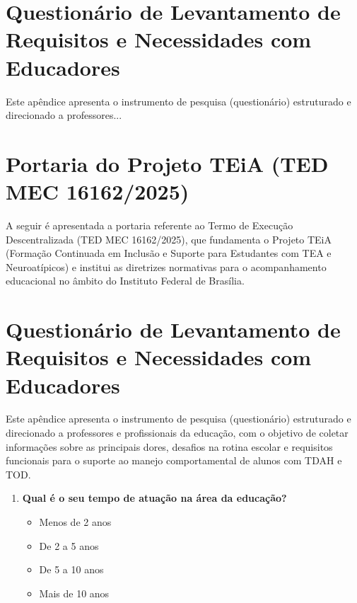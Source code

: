 \begin{apendicesenv}
\partapendices %

\chapter{Questionário de Levantamento de Requisitos e Necessidades com Educadores}
\label{apendice:questionario}
Este apêndice apresenta o instrumento de pesquisa (questionário) estruturado e direcionado a professores... 

\chapter{Portaria do Projeto TEiA (TED MEC 16162/2025)}
\label{apendice:portaria_teia}

A seguir é apresentada a portaria referente ao Termo de Execução Descentralizada (TED MEC 16162/2025), que fundamenta o Projeto TEiA (Formação Continuada em Inclusão e Suporte para Estudantes com TEA e Neuroatípicos) e institui as diretrizes normativas para o acompanhamento educacional no âmbito do Instituto Federal de Brasília.



\chapter{Questionário de Levantamento de Requisitos e Necessidades com Educadores}
\label{ap:questionario_educadores}

Este apêndice apresenta o instrumento de pesquisa (questionário) estruturado e direcionado a professores e profissionais da educação, com o objetivo de coletar informações sobre as principais dores, desafios na rotina escolar e requisitos funcionais para o suporte ao manejo comportamental de alunos com TDAH e TOD.

\begin{enumerate}
    \item \textbf{Qual é o seu tempo de atuação na área da educação?}
    \begin{itemize}
        \item[ ] Menos de 2 anos
        \item[ ] De 2 a 5 anos
        \item[ ] De 5 a 10 anos
        \item[ ] Mais de 10 anos
    \end{itemize}
    

\end{enumerate}
\end{apendicesenv}
